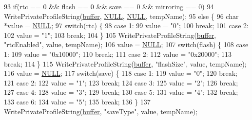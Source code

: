 \begin{DoxyCode}
93   \textcolor{keywordflow}{if}(rtc == 0 && flash == 0 && save == 0 && mirroring == 0)
94     WritePrivateProfileString(\mbox{\hyperlink{_g_b_a_8cpp_a28d4d3d8445e73a696b2d6f7eadabd96}{buffer}}, \mbox{\hyperlink{getopt1_8c_a070d2ce7b6bb7e5c05602aa8c308d0c4}{NULL}}, \mbox{\hyperlink{getopt1_8c_a070d2ce7b6bb7e5c05602aa8c308d0c4}{NULL}}, tempName);
95   \textcolor{keywordflow}{else} \{
96     \textcolor{keywordtype}{char} *value = \mbox{\hyperlink{getopt1_8c_a070d2ce7b6bb7e5c05602aa8c308d0c4}{NULL}};
97     \textcolor{keywordflow}{switch}(rtc) \{
98     \textcolor{keywordflow}{case} 1:
99       value = \textcolor{stringliteral}{"0"};
100       \textcolor{keywordflow}{break};
101     \textcolor{keywordflow}{case} 2:
102       value = \textcolor{stringliteral}{"1"};
103       \textcolor{keywordflow}{break};
104     \}
105     WritePrivateProfileString(\mbox{\hyperlink{_g_b_a_8cpp_a28d4d3d8445e73a696b2d6f7eadabd96}{buffer}}, \textcolor{stringliteral}{"rtcEnabled"}, value, tempName);
106     value = \mbox{\hyperlink{getopt1_8c_a070d2ce7b6bb7e5c05602aa8c308d0c4}{NULL}};
107     \textcolor{keywordflow}{switch}(flash) \{
108     \textcolor{keywordflow}{case} 1:
109       value = \textcolor{stringliteral}{"0x10000"};
110       \textcolor{keywordflow}{break};
111     \textcolor{keywordflow}{case} 2:
112       value = \textcolor{stringliteral}{"0x20000"};
113       \textcolor{keywordflow}{break};
114     \}
115     WritePrivateProfileString(\mbox{\hyperlink{_g_b_a_8cpp_a28d4d3d8445e73a696b2d6f7eadabd96}{buffer}}, \textcolor{stringliteral}{"flashSize"}, value, tempName);
116     value = \mbox{\hyperlink{getopt1_8c_a070d2ce7b6bb7e5c05602aa8c308d0c4}{NULL}};
117     \textcolor{keywordflow}{switch}(save) \{
118     \textcolor{keywordflow}{case} 1:
119       value = \textcolor{stringliteral}{"0"};
120       \textcolor{keywordflow}{break};
121     \textcolor{keywordflow}{case} 2:
122       value = \textcolor{stringliteral}{"1"};
123       \textcolor{keywordflow}{break};
124     \textcolor{keywordflow}{case} 3:
125       value = \textcolor{stringliteral}{"2"};
126       \textcolor{keywordflow}{break};
127     \textcolor{keywordflow}{case} 4:
128       value = \textcolor{stringliteral}{"3"};
129       \textcolor{keywordflow}{break};
130     \textcolor{keywordflow}{case} 5:
131       value = \textcolor{stringliteral}{"4"};
132       \textcolor{keywordflow}{break};
133     \textcolor{keywordflow}{case} 6:
134       value = \textcolor{stringliteral}{"5"};
135       \textcolor{keywordflow}{break};
136     \}
137     WritePrivateProfileString(\mbox{\hyperlink{_g_b_a_8cpp_a28d4d3d8445e73a696b2d6f7eadabd96}{buffer}}, \textcolor{stringliteral}{"saveType"}, value, tempName);

\end{DoxyCode}
